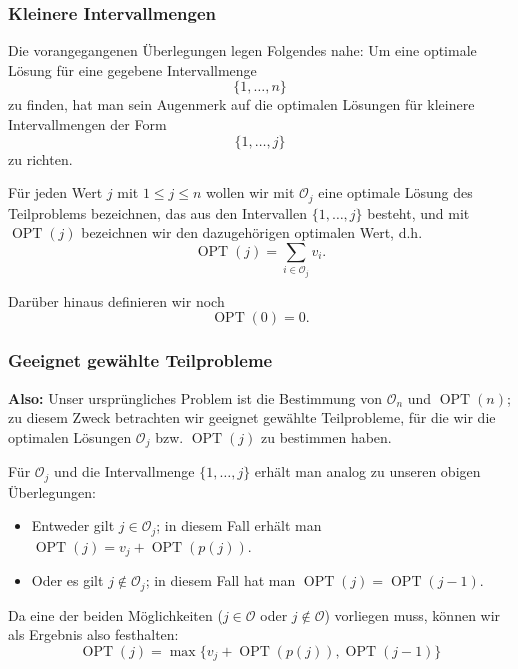\documentclass[smaller]{beamer}
\renewcommand{\O}{\mathcal{O}}
\DeclareMathOperator{\opt}{OPT}
\begin{document}
\begin{frame}
 \frametitle{Kleinere Intervallmengen}
 Die vorangegangenen Überlegungen legen Folgendes nahe: \alert{Um eine optimale Lösung für eine gegebene Intervallmenge
\[
 \{ 1,\ldots,n \}
\] 
zu finden, hat man sein Augenmerk auf die optimalen Lösungen für kleinere Intervallmengen der Form
\[
\bigl\{ 1,\ldots,j \bigr\}
\]
zu richten}. \\ \medskip

Für jeden Wert $j$ mit $1 \leq j \leq n$ wollen wir mit $\O_j$ eine optimale Lösung des \alert{Teilproblems} bezeichnen, das aus den Intervallen $\bigl\{ 1,\ldots,j \bigr\}$ besteht, und mit $\opt(j)$ bezeichnen wir den dazugehörigen optimalen Wert, d.h.
\[
\opt(j) = \sum\limits_{i \in \O_j}{v_i}.
\]

Darüber hinaus definieren wir noch
\[
\opt(0)=0.
\]
\end{frame}

\begin{frame}
\frametitle{Geeignet gewählte Teilprobleme}
\textbf{Also:} Unser ursprüngliches Problem ist die Bestimmung von $\O_n$ und $\opt(n)$; zu diesem Zweck betrachten wir \alert{geeignet gewählte Teilprobleme}, für die wir die optimalen Lösungen $\O_j$ bzw. $\opt(j)$ zu bestimmen haben. \\ \medskip

Für $\O_j$ und die Intervallmenge $\{ 1,\ldots,j \}$ erhält man analog zu unseren obigen Überlegungen:
\begin{itemize}
\item Entweder gilt $j \in \O_j$; in diesem Fall erhält man $\opt(j) = v_j + \opt{(p(j))}$.
\item Oder es gilt $j \notin \O_j$; in diesem Fall hat man $\opt{(j)} = \opt{(j-1)}$.
\end{itemize} \medskip

Da eine der beiden Möglichkeiten ($j \in \O$ oder $j \notin \O$) vorliegen muss, können wir als Ergebnis also festhalten:
\begin{equation}
\label{eq:13:1}
\opt{(j)} = \max\{ v_j + \opt{(p(j))}, \opt{(j-1)} \}
\end{equation}
\end{frame}
\end{document}
